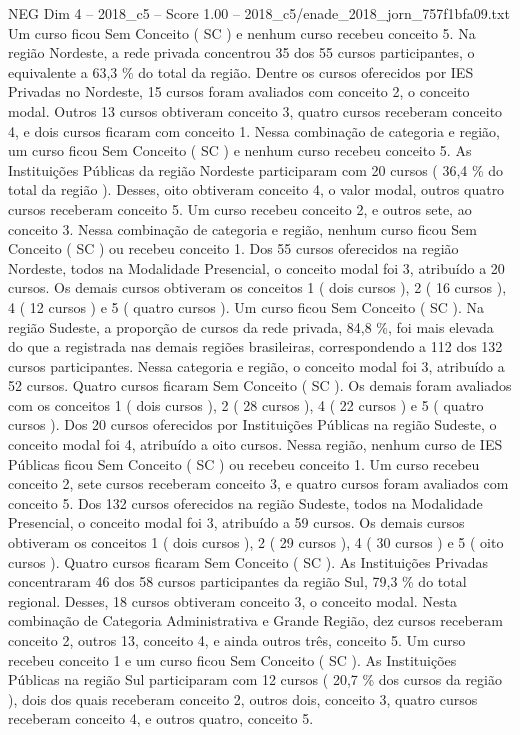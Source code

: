 \begin{textsample}{NEG Dim 4 – 2018\_c5 – Score 1.00 – 2018\_c5/enade\_2018\_jorn\_757f1bfa09.txt}
Um curso ficou Sem Conceito ( SC ) e nenhum curso recebeu conceito 5.
Na região Nordeste, a rede privada concentrou 35 dos 55 cursos participantes, o equivalente a 63,3 \% do total da região.
Dentre os cursos oferecidos por IES Privadas no Nordeste, 15 cursos foram avaliados com conceito 2, o conceito modal.
Outros 13 cursos obtiveram conceito 3, quatro cursos receberam conceito 4, e dois cursos ficaram com conceito 1.
Nessa combinação de categoria e região, um curso ficou Sem Conceito ( SC ) e nenhum curso recebeu conceito 5.
As Instituições Públicas da região Nordeste participaram com 20 cursos ( 36,4 \% do total da região ).
Desses, oito obtiveram conceito 4, o valor modal, outros quatro cursos receberam conceito 5.
Um curso recebeu conceito 2, e outros sete, ao conceito 3.
Nessa combinação de categoria e região, nenhum curso ficou Sem Conceito ( SC ) ou recebeu conceito 1.
Dos 55 cursos oferecidos na região Nordeste, todos na Modalidade Presencial, o conceito modal foi 3, atribuído a 20 cursos.
Os demais cursos obtiveram os conceitos 1 ( dois cursos ), 2 ( 16 cursos ), 4 ( 12 cursos ) e 5 ( quatro cursos ).
Um curso ficou Sem Conceito ( SC ).
Na região Sudeste, a proporção de cursos da rede privada, 84,8 \%, foi mais elevada do que a registrada nas demais regiões brasileiras, correspondendo a 112 dos 132 cursos participantes.
Nessa categoria e região, o conceito modal foi 3, atribuído a 52 cursos.
Quatro cursos ficaram Sem Conceito ( SC ).
Os demais foram avaliados com os conceitos 1 ( dois cursos ), 2 ( 28 cursos ), 4 ( 22 cursos ) e 5 ( quatro cursos ).
Dos 20 cursos oferecidos por Instituições Públicas na região Sudeste, o conceito modal foi 4, atribuído a oito cursos.
Nessa região, nenhum curso de IES Públicas ficou Sem Conceito ( SC ) ou recebeu conceito 1.
Um curso recebeu conceito 2, sete cursos receberam conceito 3, e quatro cursos foram avaliados com conceito 5.
Dos 132 cursos oferecidos na região Sudeste, todos na Modalidade Presencial, o conceito modal foi 3, atribuído a 59 cursos.
Os demais cursos obtiveram os conceitos 1 ( dois cursos ), 2 ( 29 cursos ), 4 ( 30 cursos ) e 5 ( oito cursos ).
Quatro cursos ficaram Sem Conceito ( SC ).
As Instituições Privadas concentraram 46 dos 58 cursos participantes da região Sul, 79,3 \% do total regional.
Desses, 18 cursos obtiveram conceito 3, o conceito modal.
Nesta combinação de Categoria Administrativa e Grande Região, dez cursos receberam conceito 2, outros 13, conceito 4, e ainda outros três, conceito 5.
Um curso recebeu conceito 1 e um curso ficou Sem Conceito ( SC ).
As Instituições Públicas na região Sul participaram com 12 cursos ( 20,7 \% dos cursos da região ), dois dos quais receberam conceito 2, outros dois, conceito 3, quatro cursos receberam conceito 4, e outros quatro, conceito 5.

\end{textsample}
